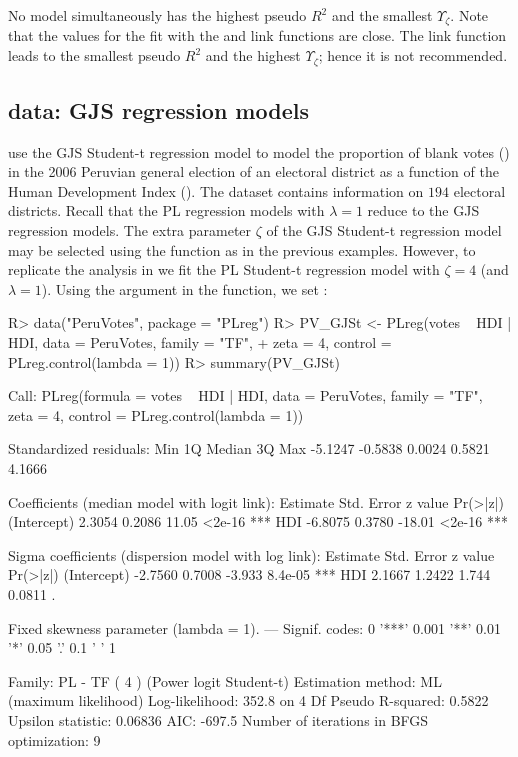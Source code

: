 No model simultaneously has the highest pseudo $R^2$ and the smallest $\Upsilon_\zeta$. Note that the values for the fit with the  and  link functions are close. The  link function leads to the smallest pseudo $R^2$ and the highest $\Upsilon_\zeta$; hence it is not recommended.

\subsection[R code]{ data: GJS regression models}

\cite{LemonteBazan2016} use the GJS Student-t regression model to model the proportion of blank votes () in the 2006 Peruvian general election of an electoral district as a function of the Human Development Index (). The  dataset contains information on $194$ electoral districts. Recall that the PL regression models with $\lambda=1$ reduce to the GJS regression models. The extra parameter $\zeta$ of the GJS Student-t regression model may be selected using the  function as in the previous examples. However, to replicate the analysis in \cite{LemonteBazan2016} we fit the PL Student-t regression model with $\zeta=4$ (and $\lambda=1$). Using the   argument in the  function, we set : 
%
\begin{Schunk}
\begin{Sinput}
R> data("PeruVotes", package = "PLreg")
R> PV_GJSt <- PLreg(votes ~ HDI | HDI, data = PeruVotes, family = "TF",
+                   zeta = 4, control = PLreg.control(lambda = 1))
R> summary(PV_GJSt)
\end{Sinput}
\begin{Soutput}
Call:
PLreg(formula = votes ~ HDI | HDI, data = PeruVotes, family = "TF", 
    zeta = 4, control = PLreg.control(lambda = 1))

Standardized residuals:
    Min      1Q  Median      3Q     Max 
-5.1247 -0.5838  0.0024  0.5821  4.1666 

Coefficients (median model with logit link):
            Estimate Std. Error z value Pr(>|z|)    
(Intercept)   2.3054     0.2086   11.05   <2e-16 ***
HDI          -6.8075     0.3780  -18.01   <2e-16 ***

Sigma coefficients (dispersion model with log link):
            Estimate Std. Error z value Pr(>|z|)    
(Intercept)  -2.7560     0.7008  -3.933  8.4e-05 ***
HDI           2.1667     1.2422   1.744   0.0811 .  

Fixed skewness parameter (lambda = 1).
---
Signif. codes:  0 '***' 0.001 '**' 0.01 '*' 0.05 '.' 0.1 ' ' 1 

Family: PL - TF ( 4 ) (Power logit Student-t)
Estimation method: ML (maximum likelihood)
Log-likelihood: 352.8 on 4 Df
Pseudo R-squared: 0.5822
Upsilon statistic: 0.06836
AIC: -697.5
Number of iterations in BFGS optimization: 9 
\end{Soutput}
\end{Schunk}
%

